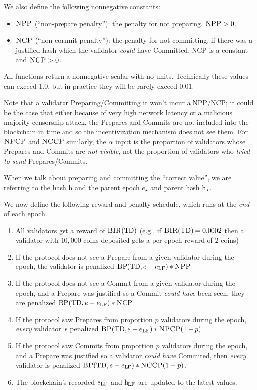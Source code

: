 \documentclass[12pt, final]{article}
\newcommand{\epoch}{\ensuremath{e}\xspace}
\newcommand{\hash}{\textnormal{h}\xspace}
\newcommand{\hashsource}{\ensuremath{\hash_{\star}}\xspace}
\newcommand{\epochsource}{\ensuremath{\epoch_{\star}}\xspace}
\newcommand{\BIR}{\textsc{BIR}\xspace}
\newcommand{\BP}{\textsc{BP}\xspace}
\newcommand{\NCP}{\textsc{NCP}\xspace}
\newcommand{\NCCP}{\textsc{NCCP}\xspace}
\newcommand{\NPP}{\textsc{NPP}\xspace}
\newcommand{\NPCP}{\textsc{NPCP}\xspace}
\newcommand{\totaldeposit}{\textnormal{TD}\xspace}
\newcommand{\epochLF}{\ensuremath{\epoch_{\textnormal{LF}}}\xspace}
\newcommand{\hashLF}{\ensuremath{\hash_{\textnormal{LF}}}\xspace} %
\begin{document}
We also define the following nonnegative constants:
\begin{itemize}
    \item $\NPP$ (``non-prepare penalty''): the penalty for not preparing. $\NPP > 0$.
    \item $\NCP$ (``non-commit penalty''): the penalty for not committing, if there was a justified hash which the validator \emph{could} have Committed.  \NCP is a constant and $\NCP > 0$.
\end{itemize}


All functions return a nonnegative scalar with no units.  Technically these values can exceed 1.0, but in practice they will be rarely exceed $0.01$.

Note that a validator Preparing/Committing it won't incur a \NPP/\NCP; it could be the case that either because of very high network latency or a malicious majority censorship attack, the Prepares and Commits are not included into the blockchain in time and so the incentivization mechanism does not see them. For $\NPCP$ and $\NCCP$ similarly, the $\alpha$ input is the proportion of validators whose Prepares and Commits are \emph{not visible}, not the proportion of validators who \emph{tried to send} Prepares/Commits. 

When we talk about preparing and committing the ``correct value'', we are referring to the hash \hash and the parent epoch $\epochsource$ and parent hash $\hashsource$.

We now define the following reward and penalty schedule, which runs at the \emph{end} of each epoch.

\begin{enumerate}
\item All validators get a reward of $\BIR(\totaldeposit)$ (e.g., if $\BIR(\totaldeposit) = 0.0002$ then a validator with $10,000$ coins deposited gets a per-epoch reward of $2$ coins)
\item If the protocol does not see a Prepare from a given validator during the epoch, the validator is penalized $\BP(\totaldeposit, \epoch - \epochLF) * \NPP$
\item If the protocol does not see a Commit from a given validator during the epoch, and a Prepare was justified so a Commit \emph{could have} been seen, they are penalized $\BP(\totaldeposit, \epoch - \epochLF) * \NCP$.
\item If the protocol saw Prepares from proportion $p$ validators during the epoch, \emph{every} validator is penalized $\BP(\totaldeposit, \epoch - \epochLF) * \NPCP(1 - p)$
\item If the protocol saw Commits from proportion $p$ validators during the epoch, and a Prepare was justified so a validator \emph{could have} Commited, then \emph{every} validator is penalized $\BP(\totaldeposit, \epoch - \epochLF) * \NCCP(1 - p)$.
\item The blockchain's recorded \epochLF and \hashLF are updated to the latest values. 
\end{enumerate}
\end{document}
